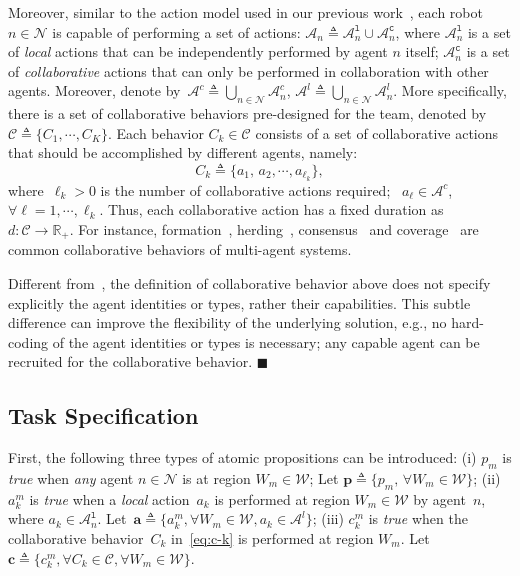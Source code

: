 Moreover, similar to the action model used in our previous work~\cite{guo2016task},
each robot $n\in \mathcal{N}$ is capable of performing a set of actions:
$\mathcal{A}_n\triangleq \mathcal{A}^{\texttt{l}}_n \cup \mathcal{A}^{\texttt{c}}_n$,
where $\mathcal{A}^{\texttt{l}}_n$ is a set of \emph{local} actions that can be independently performed by agent $n$ itself;
$\mathcal{A}^{\texttt{c}}_n$ is a set of \emph{collaborative} actions that can only be performed
in collaboration with other agents.
Moreover, denote by~$\mathcal{A}^c\triangleq\bigcup_{n\in\mathcal{N}}\mathcal{A}^c_n$,
$\mathcal{A}^l\triangleq\bigcup_{n\in\mathcal{N}}\mathcal{A}^l_n$.
More specifically,
there is a set of collaborative behaviors pre-designed for the team,
denoted by~$\mathcal{C}\triangleq \{C_1,\cdots, C_K\}$. 
Each behavior $C_k\in \mathcal{C}$ consists of a set of collaborative actions
that should be accomplished by different agents, namely:
\begin{equation}\label{eq:c-k}
C_k\triangleq \{a_1,\,a_2,\cdots,a_{\ell_k}\},
\end{equation}
where~$\ell_k>0$ is the number of collaborative actions required;
~$a_{\ell}\in \mathcal{A}^c$, $\forall \ell=1,\cdots,\ell_k$.
Thus, each collaborative action has a fixed duration as~$d:\mathcal{C}\rightarrow \mathbb{R}_{+}$.
For instance, formation~\cite{chen2005formation}, herding~\cite{pan2007multi},
 consensus~\cite{li2009consensus} and coverage~\cite{mesbahi2010graph}
 are common collaborative behaviors of multi-agent systems.



\begin{remark}\label{rm:collaborative}
Different from~\cite{luo2021temporal,sahin2019multirobot, jones2019scratchs},
the definition of collaborative behavior above does not specify explicitly
the agent identities or {types}, rather their capabilities.
This subtle difference can improve the flexibility of the underlying solution,
e.g.,  no hard-coding of the agent identities or types is necessary;
any capable agent can be recruited for the collaborative behavior.
\hfill $\blacksquare$
\end{remark}



\subsection{Task Specification}\label{subsec:task-specification}
First, the following three types of atomic propositions can be introduced:
(i) $p_m$ is \emph{true} when \emph{any} agent $n\in \mathcal{N}$ is at region ${W}_m\in {\mathcal{W}}$;
Let $\mathbf{p}\triangleq \{p_m,\, \forall {W}_m \in {\mathcal{W}}\}$;
(ii) $a^m_k$ is \emph{true} when a \emph{local} action~$a_k$ is performed at region ${W}_m\in{\mathcal{W}}$ by
agent~$n$, where $a_k \in \mathcal{A}_n^{\texttt{l}}$.
Let~$\mathbf{a} \triangleq\{a^m_k,\forall {W}_m \in \mathcal{W}, a_k\in \mathcal{A}^{l}\}$;
(iii) $c^m_k$ is \emph{true} when the collaborative behavior~$C_k$ in~\eqref{eq:c-k} is performed at region $W_m$.
Let $\mathbf{c} \triangleq\{c^m_k,\forall C_k \in \mathcal{C},\forall {W}_m \in {\mathcal{W}}\}$.

